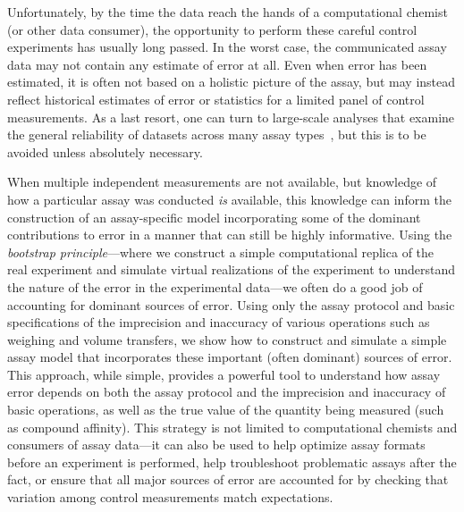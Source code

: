\documentclass[aps,pre,twocolumn,nofootinbib,superscriptaddress,linenumbers]{revtex4-1}
\begin{document}
Unfortunately, by the time the data reach the hands of a computational chemist (or other data consumer), the opportunity to perform these careful control experiments has usually long passed.
In the worst case, the communicated assay data may not contain any estimate of error at all.
Even when error has been estimated, it is often not based on a holistic picture of the assay, but may instead reflect historical estimates of error or statistics for a limited panel of control measurements.
As a last resort, one can turn to large-scale analyses that examine the general reliability of datasets across many assay types~\cite{kramer_experimental_2012,kalliokoski_comparability_2013}, but this is to be avoided unless absolutely necessary.

When multiple independent measurements are not available, but knowledge of how a particular assay was conducted \emph{is} available, this knowledge can inform the construction of an assay-specific model incorporating some of the dominant contributions to error in a manner that can still be highly informative.
Using the \emph{bootstrap principle}---where we construct a simple computational replica of the real experiment and simulate virtual realizations of the experiment to understand the nature of the error in the experimental data---we often do a good job of accounting for dominant sources of error.
Using only the assay protocol and basic specifications of the imprecision and inaccuracy of various operations such as weighing and volume transfers, we show how to construct and simulate a simple assay model that incorporates these important (often dominant) sources of error. 
This approach, while simple, provides a powerful tool to understand how assay error depends on both the assay protocol and the imprecision and inaccuracy of basic operations, as well as the true value of the quantity being measured (such as compound affinity). 
This strategy is not limited to computational chemists and consumers of assay data---it can also be used to help optimize assay formats before an experiment is performed, help troubleshoot problematic assays after the fact, or ensure that all major sources of error are accounted for by checking that variation among control measurements match expectations.
\end{document}
